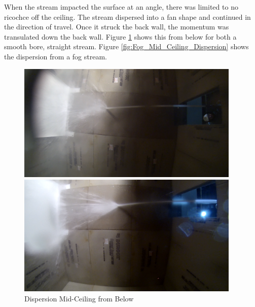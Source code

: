 \documentclass[12pt,oneside]{book}
\begin{document}
When the stream impacted the surface at an angle, there was limited to no ricochce off the ceiling. The stream dispersed into a fan shape and continued in the direction of travel. Once it struck the back wall, the momentum was transulated down the back wall. Figure \ref{fig:Mid_Ceiling_Dispersion} shows this from below for both a smooth bore, straight stream. Figure \ref{fig:Fog_Mid_Ceiling_Dispersion} shows the dispersion from a fog stream.

\begin{figure}[H]
	\centering
	\begin{minipage}[b]{0.45\textwidth}
		\centering
		\includegraphics[width=0.95\textwidth]{Figures/Water_Distribution/Nozzle_Directions/Exterior_MidCeiling_SB_FirstFloor_Under.png}
	\end{minipage}
	\begin{minipage}[b]{0.45\textwidth}
		\centering
		\includegraphics[width=0.95\textwidth]{Figures/Water_Distribution/Nozzle_Directions/Exterior_MidCeiling_SS_FirstFloor_Under.png}
	\end{minipage}
	\caption{Dispersion Mid-Ceiling from Below}
	\label{fig:Mid_Ceiling_Dispersion}
\end{figure}
\end{document}
